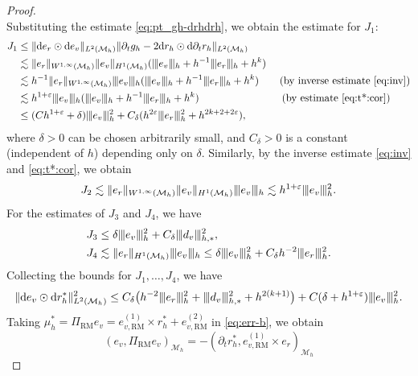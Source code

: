 \documentclass[10pt,a4paper]{amsart}
\newcommand{\Man}{\mathcal{M}}
\newcommand{\RM}{\mathrm{RM}}
\newcommand{\normt}[1]{%
	\vert\kern-0.9pt\vert\kern-0.9pt\vert #1
	\vert\kern-0.9pt\vert\kern-0.9pt\vert}
\begin{document}
\begin{proof}
\begin{equation}
\end{equation} 
Substituting the estimate \eqref{eq:pt_gh-drhdrh}, we obtain the estimate for $J_1$: 
\[ \begin{aligned}
    J_1 &\le  
\|  \mathrm{d} e_{r} \odot \mathrm{d} e_{v} \|_{L^2(\Man_h)}\| \partial_t g_h - 2 \mathrm{d} r_h \odot \mathrm{d} \partial_t r_h \|_{L^2(\Man_h)}\\
&\lesssim \|  e_{r} \|_{W^{1,\infty}(\Man_h)} \| e_v \|_{H^1(\Man_h)}
(\normt{ e_v }_{h} + h^{-1} \normt{e_r}_h + h^k ) \\ 
&\lesssim h^{-1}\|  e_{r} \|_{W^{1,\infty}(\Man_h)} \normt{e_v}_h 
(\normt{ e_v }_{h} + h^{-1} \normt{e_r}_h + h^k)
\qquad \text{(by inverse estimate \eqref{eq:inv})}
\\ 
&\lesssim h^{1+\varepsilon} \normt{e_v}_h
(\normt{ e_v }_{h} + h^{-1} \normt{e_r}_h + h^k )
\qquad\qquad\qquad\qquad \text{(by estimate \eqref{eq:t*:cor})}\\
& \leq (Ch^{1+\varepsilon} + \delta ) \normt{e_v}_h^2 
+ C_{\delta}( h^{2\varepsilon} \normt{e_r}_h^2 + h^{2k+2+2\varepsilon} ),
\end{aligned}
\]
where $\delta>0$ can be chosen arbitrarily small, and $C_{\delta}>0$ is a constant (independent of $h$) depending only on $\delta$. 
Similarly, by the inverse estimate \eqref{eq:inv} and \eqref{eq:t*:cor}, we obtain
\[
J_2 \lesssim
\| e_r \|_{W^{1,\infty}(\Man_h)} \| e_v \|_{H^1(\Man_h)} \normt{e_v}_h
\lesssim h^{1+\varepsilon} \normt{e_v}_h^2.
\]
For the estimates of \(J_3\) and \(J_4\), we have
\begin{subequations}
\begin{align}
J_3 & \leq \delta \normt{e_v}_h^2 + C_{\delta} \normt{d_v}_{h,*}^2, \notag \\
J_4 &\lesssim \|e_r\|_{H^1(\Man_h)}\normt{e_v}_h
\leq \delta \normt{e_v}_h^2 +
C_{\delta}h^{-2}\normt{e_r}_h^2. \notag
\end{align}
\end{subequations}
Collecting the bounds for $J_1,\ldots,J_4$, we have
\begin{equation}\label{eq:devdr}
    \|\mathrm{d} e_{v} \odot \mathrm{d} r_h^{*}\|_{L^2(\Man_h)}^2
\leq 
C_{\delta}\big( 
h^{-2}\normt{e_r}_h^2 + \normt{ d_v }_{h,*}^2 + h^{2(k+1)}\big) 
+ C(\delta + h^{1+\varepsilon}) \normt{e_v}^2_h.
\end{equation}
Taking $\mu_h^* = \Pi_{\RM} e_v = e_{v, \RM}^{(1)} \times r_h^* +  e_{v, \RM}^{(2)}$ in \eqref{eq:err-b}, we obtain 
\[ 
    (e_v, \Pi_{\RM} e_v)_{\Man_h} 
     = - (\partial_t r_h^*,  e_{v, \RM}^{(1)} \times e_r)_{\Man_h} 
\]
\end{proof}
\end{document}
